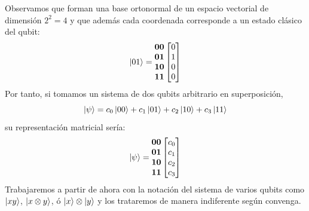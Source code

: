 \documentclass[a4paper]{article}
\numberwithin{equation}{section}
\begin{document}
Observamos que forman una base ortonormal de un espacio vectorial de dimensión $2^2 = 4$ y que además cada coordenada corresponde a un estado clásico del qubit:
\begin{equation}
\ket{01} =
\begin{matrix}
	\textbf{00} \\ \textbf{01} \\ \textbf{10} \\ \textbf{11}
\end{matrix}
\begin{bmatrix}
	0 \\ 1 \\ 0 \\ 0
\end{bmatrix}
\end{equation}
Por tanto, si tomamos un sistema de dos qubits arbitrario en superposición,
\begin{equation}
\ket{\psi} = c_0 \ket{00} + c_1 \ket{01} + c_2 \ket{10} + c_3 \ket{11}
\end{equation}
su representación matricial sería:
\begin{equation}
\ket{\psi} =
\begin{matrix}
	\textbf{00} \\ \textbf{01} \\ \textbf{10} \\ \textbf{11}
\end{matrix}
\begin{bmatrix}
	c_0 \\ c_1 \\ c_2 \\ c_3
\end{bmatrix}
\end{equation}
Trabajaremos a partir de ahora con la notación del sistema de varios qubits como $\ket{xy}$, $\ket{x\otimes y}$, ó $\ket{x}\otimes\ket{y}$ y los trataremos de manera indiferente según convenga.\\
\end{document}
